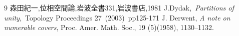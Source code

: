 \documentclass[leqno]{jsarticle}
\begin{document}
	
\begin{thebibliography}{9}
森田紀一,位相空間論,岩波全書331,岩波書店,1981
J.Dydak,\ \textit{Partitions of unity},\ Topology Proceedings 27\ (2003)\ pp125-171
J. Derwent, 
\textit{A note on numerable covers}, 
Proc. Amer. Math. Soc., 
19 (5)(1958), 
1130--1132. 

\end{thebibliography}




			
\end{document}
